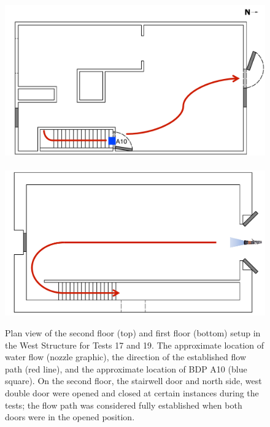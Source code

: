 \documentclass[12pt,oneside]{book}
\begin{document}
\begin{figure}[!ht]
	\includegraphics[width=6in]{../Figures/Floor_Plans/Specific_Tests/West_Hose_Test_2nd_Floor_Annotated}
	\\~\\
	\includegraphics[width=6in]{../Figures/Floor_Plans/Specific_Tests/West_Hose_Test_19_1st_Floor_Annotated}
	\caption[Plan view of the West Structure setup for Tests 17 and 19.]{Plan view of the second floor (top) and first floor (bottom) setup in the West Structure for Tests 17 and 19. The approximate location of water flow (nozzle graphic), the direction of the established flow path (red line), and the approximate location of BDP A10 (blue square). On the second floor, the stairwell door and north side, west double door were opened and closed at certain instances during the tests; the flow path was considered fully established when both doors were in the opened position.}
	\label{fig:flow_path_2}
\end{figure}
\FloatBarrier
\end{document}

